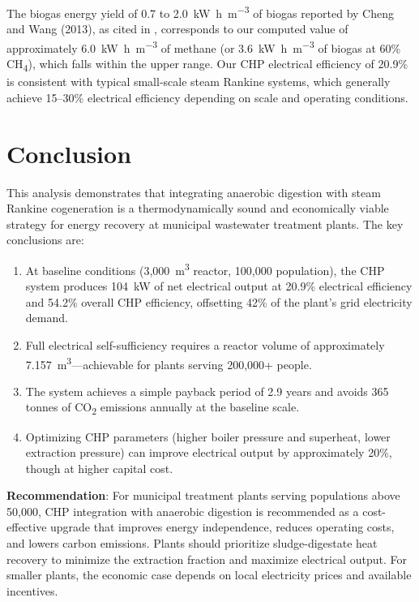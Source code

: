 \documentclass[12pt, letterpaper]{article}
\begin{document}
The biogas energy yield of \SI{0.7}{} to \SI{2.0}{\kilo\watt\hour\per\cubic\metre} of biogas reported by Cheng and Wang (2013), as cited in \citet{nathia2018}, corresponds to our computed value of approximately \SI{6.0}{\kilo\watt\hour\per\cubic\metre} of methane (or \SI{3.6}{\kilo\watt\hour\per\cubic\metre} of biogas at 60\% CH\textsubscript{4}), which falls within the upper range. Our CHP electrical efficiency of 20.9\% is consistent with typical small-scale steam Rankine systems, which generally achieve 15--30\% electrical efficiency depending on scale and operating conditions.

\section{Conclusion}

This analysis demonstrates that integrating anaerobic digestion with steam Rankine cogeneration is a thermodynamically sound and economically viable strategy for energy recovery at municipal wastewater treatment plants. The key conclusions are:

\begin{enumerate}
  \item At baseline conditions (3,000~m\textsuperscript{3} reactor, 100,000 population), the CHP system produces \SI{104}{\kilo\watt} of net electrical output at 20.9\% electrical efficiency and 54.2\% overall CHP efficiency, offsetting 42\% of the plant's grid electricity demand.

  \item Full electrical self-sufficiency requires a reactor volume of approximately \SI{7,157}{\cubic\metre}---achievable for plants serving 200,000+ people.

  \item The system achieves a simple payback period of 2.9 years and avoids 365 tonnes of CO\textsubscript{2} emissions annually at the baseline scale.

  \item Optimizing CHP parameters (higher boiler pressure and superheat, lower extraction pressure) can improve electrical output by approximately 20\%, though at higher capital cost.
\end{enumerate}

\textbf{Recommendation}: For municipal treatment plants serving populations above 50,000, CHP integration with anaerobic digestion is recommended as a cost-effective upgrade that improves energy independence, reduces operating costs, and lowers carbon emissions. Plants should prioritize sludge-digestate heat recovery to minimize the extraction fraction and maximize electrical output. For smaller plants, the economic case depends on local electricity prices and available incentives.
\end{document}
